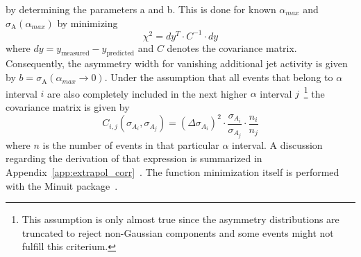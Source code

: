 by determining the parameters a and b. This is done for known $\alpha_{max}$ and $\sigma_\mathrm{A}(\alpha_{max})$ by minimizing 
\begin{equation}
\chi^2 = dy^T \cdot C^{-1} \cdot dy
\end{equation}
where $dy = y_{\mathrm{measured}} - y_{\mathrm{predicted}}$ and $C$ denotes the covariance matrix. Consequently, the asymmetry width for vanishing additional jet activity is given by $b=\sigma_\mathrm{A}(\alpha_{max} \rightarrow 0)$. Under the assumption that all events that belong to $\alpha$ interval $i$ are also completely included in the next higher $\alpha$ interval $j$~\footnote{This assumption is only almost true since the asymmetry distributions are truncated to reject non-Gaussian components and some events might not fulfill this criterium.} the covariance matrix is given by
\begin{equation}
C_{i,j}(\sigma_{A_i},\sigma_{A_j}) = (\Delta \sigma_{A_i})^2 \cdot \frac{\sigma_{A_i}}{\sigma_{A_j}} \cdot \frac{n_i}{n_j} 
\label{eq:jer_corr}
\end{equation}
where $n$ is the number of events in that particular $\alpha$ interval. A discussion regarding the derivation of that expression is summarized in Appendix~\ref{app:extrapol_corr}~\cite{JOtt}. The function minimization itself is performed with the Minuit package~\cite{Minuit}.   

